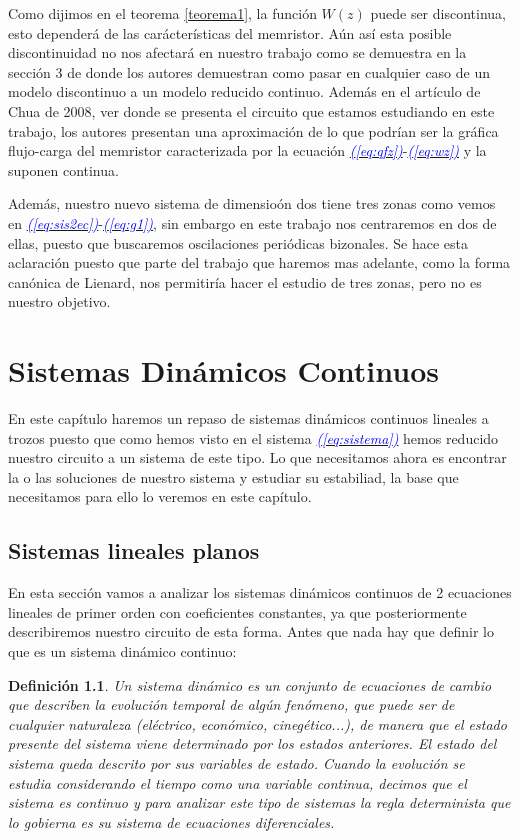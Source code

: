 \documentclass[12pt,a4paper]{report} %
\newtheorem{definicion}{Definición} %
\newcommand{\eref}[1]{\hyperref[#1]{\textcolor{blue}{\textit{(\ref*{#1})}}}}
\begin{document}
	\vspace{0.5cm}Como dijimos en el teorema \ref{teorema1}, la función $W(z)$ puede ser discontinua, esto dependerá de las carácterísticas del memristor. Aún así esta posible discontinuidad no nos afectará en nuestro trabajo como se demuestra en la sección 3 de \cite{ponce} donde los autores demuestran como pasar en cualquier caso de un modelo discontinuo a un modelo reducido continuo. Además en el artículo de Chua de 2008, ver \cite{chuaoscillator2008} donde se presenta el circuito que estamos estudiando en este trabajo, los autores presentan una aproximación de lo que podrían ser la gráfica flujo-carga del memristor caracterizada por la ecuación \eref{eq:qfz}-\eref{eq:wz} y la suponen continua.
	
	\vspace{0.5cm}Además, nuestro nuevo sistema de dimensioón dos tiene tres zonas como vemos en \eref{eq:sis2ec}-\eref{eq:g1}, sin embargo en este trabajo nos centraremos en dos de ellas, puesto que buscaremos oscilaciones periódicas bizonales. Se hace esta aclaración puesto que parte del trabajo que haremos mas adelante, como la forma canónica de Lienard, nos permitiría hacer el estudio de tres zonas, pero no es nuestro objetivo.
	
	

	
	\chapter{Sistemas Dinámicos Continuos}
	En este capítulo haremos un repaso de sistemas dinámicos continuos lineales a trozos puesto que como hemos visto en el sistema \eref{eq:sistema} hemos reducido nuestro circuito a un sistema de este tipo. Lo que necesitamos ahora es encontrar la o las soluciones de nuestro sistema y estudiar su estabiliad, la base que necesitamos para ello lo veremos en este capítulo.
	\newpage
	\section{Sistemas lineales planos}
	\label{sec:sislinplanos}
	En esta sección vamos a analizar los sistemas dinámicos continuos de 2 ecuaciones lineales de primer orden con coeficientes constantes, ya que posteriormente describiremos nuestro circuito de esta forma.
	Antes que nada hay que definir lo que es un sistema dinámico continuo:
	
	\begin{definicion}
		Un sistema dinámico es un conjunto de ecuaciones de cambio que describen la evolución temporal de algún fenómeno, que puede ser de cualquier naturaleza (eléctrico, económico, cinegético...), de manera que el estado presente del sistema viene determinado por los estados anteriores. El estado del sistema queda descrito por sus variables de estado. Cuando la evolución se estudia considerando el tiempo como una variable 
		continua, decimos que el sistema es continuo y para analizar este tipo de sistemas la regla determinista que lo gobierna es su sistema de ecuaciones diferenciales.
	\end{definicion}
	
\end{document}
